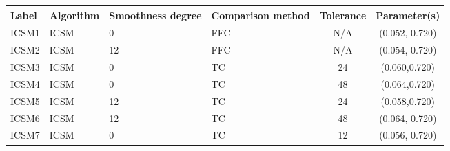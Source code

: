 \begin{table}[!ht]
  \begin{tabular}{| l | l | p{2cm} | p{2cm} | c | c | }\hline
    Label & Algorithm & Smoothness degree & Comparison method & Tolerance & Parameter(s)\\\hline
    ICSM1 & ICSM & 0 & FFC & N/A & (0.052, 0.720) \\\hline
    ICSM2 & ICSM & 12 & FFC & N/A & (0.054, 0.720) \\\hline
    ICSM3 & ICSM & 0 & TC & 24 & (0.060,0.720) \\\hline
    ICSM4 & ICSM & 0 & TC & 48 & (0.064,0.720) \\\hline
    ICSM5 & ICSM & 12 & TC & 24 & (0.058,0.720) \\\hline
    ICSM6 & ICSM & 12 & TC & 48 & (0.064, 0.720) \\\hline
    ICSM7 & ICSM & 0 & TC & 12 & (0.056, 0.720) \\\hline\hline
%


\end{tabular}
\end{table}
